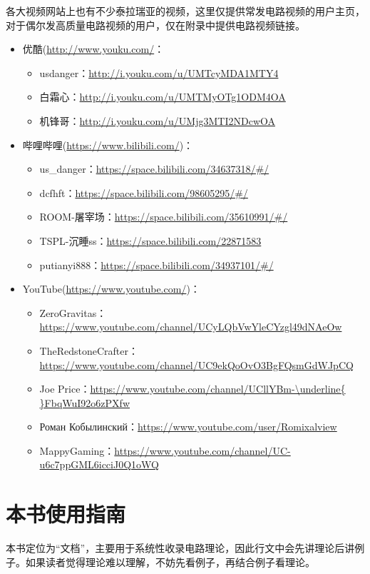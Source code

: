 各大视频网站上也有不少泰拉瑞亚的视频，这里仅提供常发电路视频的用户主页，对于偶尔发高质量电路视频的用户，仅在附录中提供电路视频链接。
\begin{itemize}
\item 优酷(\url{http://www.youku.com/}：
\begin{itemize}
\item usdanger：\url{http://i.youku.com/u/UMTcyMDA1MTY4}
\item 白霜心：\url{http://i.youku.com/u/UMTMyOTg1ODM4OA}
\item 机锋哥：\url{http://i.youku.com/u/UMjg3MTI2NDcwOA}
\end{itemize}
\item 哔哩哔哩(\url{https://www.bilibili.com/})：
\begin{itemize}
\item us\_danger：\url{https://space.bilibili.com/34637318/#/}
\item dcfhft：\url{https://space.bilibili.com/98605295/#/}
\item ROOM-屠宰场：\url{https://space.bilibili.com/35610991/#/}
\item TSPL-沉睡ss：\url{https://space.bilibili.com/22871583}
\item putianyi888：\url{https://space.bilibili.com/34937101/#/}
\end{itemize}
\item YouTube(\url{https://www.youtube.com/})：
\begin{itemize}
\item ZeroGravitas：\url{https://www.youtube.com/channel/UCyLQbVwYleCYzgl49dNAeOw}
\item TheRedstoneCrafter：\url{https://www.youtube.com/channel/UC9ekQoOvO3BgFQsmGdWJpCQ}
\item Joe Price：\url{https://www.youtube.com/channel/UCllYBm-\underline{ }FbqWuI92o6zPXfw}
\item Роман Кобылинский：\url{https://www.youtube.com/user/Romixalview}
\item MappyGaming：\url{https://www.youtube.com/channel/UC-u6c7ppGML6icciJ0Q1oWQ}
\end{itemize}
\end{itemize}

\section{本书使用指南}
本书定位为“文档”，主要用于系统性收录电路理论，因此行文中会先讲理论后讲例子。如果读者觉得理论难以理解，不妨先看例子，再结合例子看理论。

